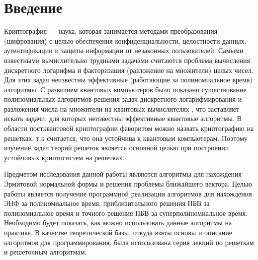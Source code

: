 \newpage

\section{Введение}

Криптография --- наука, которая занимается методами преобразования (шифрования) с целью обеспечения конфиденциальности, целостности данных, аутентификации и защиты информации от незаконных пользователей. Самыми известными вычислительно трудными задачами считаются проблема вычисления дискретного логарифма и факторизация (разложение на множители) целых чисел. Для этих задач неизвестны эффективные (работающие за полиномиальное время) алгоритмы. С развитием квантовых компьютеров было показано существование полиномиальных алгоритмов решения задач дискретного логарифмирования и разложения числа на множители на квантовых вычислителях \cite{Shor}, что заставляет искать задачи, для которых неизвестны эффективные квантовые алгоритмы. В области постквантовой криптографии фаворитом можно назвать криптографию на решетках, т.к считается, что она устойчива к квантовым компьютерам. Поэтому изучение задач теорий решеток является основной целью при построении устойчивых криптосистем на решетках.

Предметом исследования данной работы являются алгоритмы для нахождения Эрмитовой нормальной формы и решения проблемы ближайшего вектора. Целью работы является получение программной реализации алгоритмов для нахождения ЭНФ за полиномиальное время, приблизительного решения ПБВ за полиномиальное время и точного решения ПБВ за суперполиномиальное время. Необходимо будет показать, как можно использовать данные алгоритмы на практике. В качестве теоретической базы, откуда взяты основы и описание алгоритмов для программирования, была использована серия лекций по решеткам и решеточным алгоритмам.


\clearpage

